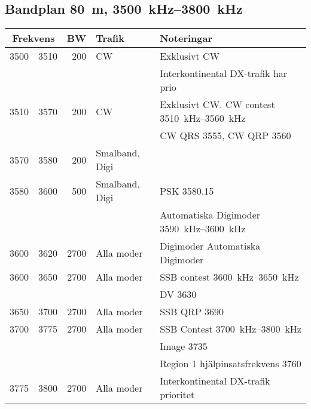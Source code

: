\subsection{Bandplan \qty{80}{\metre}, \SIrange{3500}{3800}{\kilo\hertz}}
\begin{tabular}{rrrll}
\multicolumn{2}{c}{\textbf{Frekvens}} & \textbf{BW} & \textbf{Trafik}
& \textbf{Noteringar} \\ \hline

3500 & 3510 & 200  & CW             & Exklusivt CW                                    \\ 
     &      &      &                & Interkontinental DX-trafik har prio             \\ \hline
3510 & 3570 & 200  & CW             & Exklusivt CW. CW contest \SIrange{3510}{3560}{\kilo\hertz}  \\ 
     &      &      &                & CW QRS \num{3555}, CW QRP \num{3560}            \\ \hline
3570 & 3580 & 200  & Smalband, Digi &                                                 \\ \hline
3580 & 3600 & 500  & Smalband, Digi & PSK \num{3580,15}                               \\
&      &      &                & Automatiska Digimoder \SIrange{3590}{3600}{\kilo\hertz} \\ \hline
3600 & 3620 & 2700 & Alla moder     & Digimoder Automatiska Digimoder                 \\ \hline
3600 & 3650 & 2700 & Alla moder     & SSB contest \SIrange{3600}{3650}{\kilo\hertz}           \\
     &      &      &                & DV \num{3630}                                   \\ \hline
3650 & 3700 & 2700 & Alla moder     & SSB QRP \num{3690}                              \\ \hline
3700 & 3775 & 2700 & Alla moder     & SSB Contest \SIrange{3700}{3800}{\kilo\hertz}               \\
     &      &      &                & Image \num{3735}                                \\
     &      &      &                & Region 1 hjälpinsatsfrekvens \num{3760}         \\ \hline
3775 & 3800 & 2700 & Alla moder     & Interkontinental DX-trafik prioritet            \\
\end{tabular}

